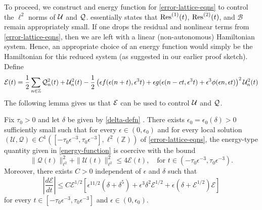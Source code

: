 To proceed, we construct and energy function for \cref{error-lattice-eqns} to control the \(\ell^2\) norms of \(\mathcal{U}\) and \(\mathcal{Q}\).  essentially states that \(\mathrm{Res}^{(1)}(t)\), \(\mathrm{Res}^{(2)}(t)\), and \(\mathcal B\) remain appropriately small. If one drops the residual and nonlinear terms from \cref{error-lattice-eqns}, then we are left with a linear (non-autonomous) Hamiltonian system. Hence, an appropriate choice of an energy function would simply be the Hamiltonian for this reduced system (as suggested in our earlier proof sketch). Define 
\begin{equation}\label{energy-function}
	\mathcal{E}(t) = \frac 1 2 \sum_{n\in \mathbb Z} \mathcal Q_n^2(t) + \mathcal U_n^2(t) - \frac 1 2 \left(\epsilon f(\epsilon(n+t), \epsilon^3 t) + \epsilon g(\epsilon(n-ct, \epsilon^3t) + \epsilon^3 \phi(\epsilon n, \epsilon t)\right)^2 \mathcal U_n^2(t)
\end{equation}
The following lemma gives us that \(\mathcal{E}\) can be used to control \(\mathcal{U}\) and \(\mathcal{Q}\).
\begin{lem}\label{energy-coercive-bounds-lem}
	Fix \(\tau_0>0 \) and let \(\delta\) be given by \cref{delta-defn} . There exists \(\epsilon_0 = \epsilon_0(\delta) >0\) sufficiently small such that for every \(\epsilon \in (0,\epsilon_0)\) and for every local solution \((\mathcal U, \mathcal Q) \in C^1([-\tau_0\epsilon^{-3}, \tau_0\epsilon^{-3}], \ell^2(\mathbb Z))\) of \cref{error-lattice-eqns}, the energy-type quantity given in \cref{energy-function} is coercive with the bound
	\begin{equation}\label{coercive-bound}
		\|\mathcal Q(t) \|_{\ell^2}^2 + \| \mathcal U (t) \|_{\ell^2}^2 \leq  4 \mathcal E(t), \quad \text{for } t\in(-\tau_0\epsilon^{-3}, \tau_0\epsilon^{-3}).
	\end{equation}
	Moreover, there exists \(C> 0\) independent of \(\epsilon\) and \(\delta\) such that 
	\begin{equation*}
		\left|\frac{d\mathcal E}{dt} \right| \leq C \mathcal E^{1/2}\left[ \epsilon^{11/2} (\delta + \delta^5)  + \epsilon^3\delta^2\mathcal E^{1/2} + \epsilon(\delta + \mathcal{E}^{1/2})\mathcal E\right]
	\end{equation*}
	for every \(t\in [-\tau_0\epsilon^{-3}, \tau_0\epsilon^{-3}]\) and \(\epsilon \in (0,\epsilon_0)\). 	  
\end{lem}
